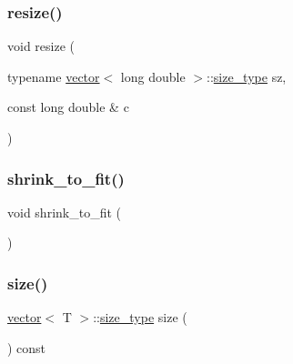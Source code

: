 \mbox{\label{classvector_a0c6e21bc9719a16aced0e96ac5580e74}} 
\subsubsection{\texorpdfstring{resize()}{resize()}\hspace{0.1cm}{\footnotesize\ttfamily [30/30]}}
{\footnotesize\ttfamily void resize (\begin{DoxyParamCaption}\item[{typename \mbox{\hyperlink{classvector}{vector}}$<$ long double $>$\+::\mbox{\hyperlink{classvector_ada51e68d31936547d3729c82daf6b7c6}{size\+\_\+type}}}]{sz,  }\item[{const long double \&}]{c }\end{DoxyParamCaption})}

\mbox{\label{classvector_a5f16304f80b6fb253c7b0ead3e16dd18}} 
\subsubsection{\texorpdfstring{shrink\+\_\+to\+\_\+fit()}{shrink\_to\_fit()}}
{\footnotesize\ttfamily void shrink\+\_\+to\+\_\+fit (\begin{DoxyParamCaption}{ }\end{DoxyParamCaption})}

\mbox{\label{classvector_abec25c66aa9cfd72297435fd47e3dac1}} 
\subsubsection{\texorpdfstring{size()}{size()}}
{\footnotesize\ttfamily \mbox{\hyperlink{classvector}{vector}}$<$ T $>$\+::\mbox{\hyperlink{classvector_ada51e68d31936547d3729c82daf6b7c6}{size\+\_\+type}} size (\begin{DoxyParamCaption}{ }\end{DoxyParamCaption}) const\hspace{0.3cm}{\ttfamily [noexcept]}}

\mbox{\label{classvector_a4ee8c32c194e2497afcc60775cab3169}} 
